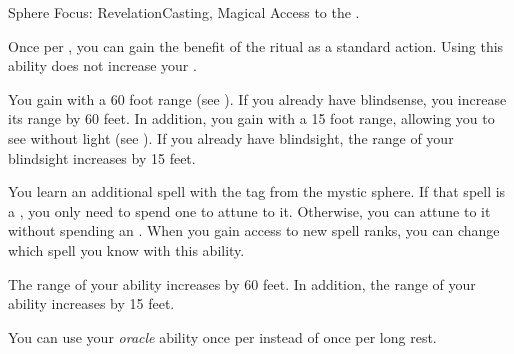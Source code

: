     \begin{feat}{Sphere Focus: Revelation}{Casting, Magical}
        \featpre Access to the  .

         Once per , you can gain the benefit of the  ritual as a standard action.
        Using this ability does not increase your .

         You gain  with a 60 foot range (see ).
        If you already have blindsense, you increase its range by 60 feet.
        In addition, you gain  with a 15 foot range, allowing you to see without light (see ).
        If you already have blindsight, the range of your blindsight increases by 15 feet.

         You learn an additional spell with the  tag from the  mystic sphere.
        If that spell is a , you only need to spend one  to attune to it.
        Otherwise, you can attune to it without spending an .
        When you gain access to new spell ranks, you can change which spell you know with this ability.

         The range of your  ability increases by 60 feet.
        In addition, the range of your  ability increases by 15 feet.

         You can use your \textit{oracle} ability once per  instead of once per long rest.
    \end{feat}

